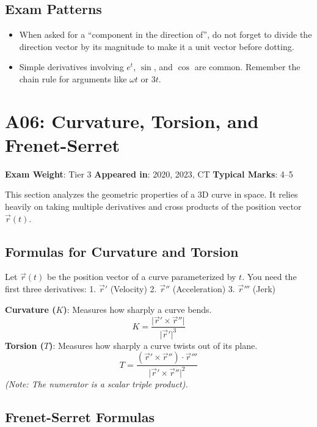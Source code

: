 \documentclass[
]{article}
\providecommand{\tightlist}{%
  \setlength{\itemsep}{0pt}\setlength{\parskip}{0pt}}
\renewenvironment{quote}
  {\begin{tcolorbox}[
     colback=calloutbg,
     colframe=calloutframe,
     colupper=callouttext,
     arc=3pt,
     boxrule=0.5pt,
     leftrule=0.5pt,
     borderline west={3pt}{0pt}{calloutaccent},
     left=8pt,
     right=8pt,
     top=6pt,
     bottom=6pt
   ]}
  {\end{tcolorbox}}
\begin{document}
\subsection{Exam Patterns}\label{exam-patterns-4}

\begin{itemize}
\tightlist
\item
  When asked for a ``component in the direction of'', do not forget to
  divide the direction vector by its magnitude to make it a unit vector
  before dotting.
\item
  Simple derivatives involving \(e^t\), \(\sin\), and \(\cos\) are
  common. Remember the chain rule for arguments like \(\omega t\) or
  \(3t\).
\end{itemize}

\section{A06: Curvature, Torsion, and
Frenet-Serret}\label{a06-curvature-torsion-and-frenet-serret}

\begin{quote}
\textbf{Exam Weight}: Tier 3 \textbar{} \textbf{Appeared in}: 2020,
2023, CT \textbar{} \textbf{Typical Marks}: 4--5
\end{quote}

This section analyzes the geometric properties of a 3D curve in space.
It relies heavily on taking multiple derivatives and cross products of
the position vector \(\vec{r}(t)\).

\subsection{Formulas for Curvature and
Torsion}\label{formulas-for-curvature-and-torsion}

Let \(\vec{r}(t)\) be the position vector of a curve parameterized by
\(t\). You need the first three derivatives: 1. \(\vec{r}'\) (Velocity)
2. \(\vec{r}''\) (Acceleration) 3. \(\vec{r}'''\) (Jerk)

\textbf{Curvature (\(K\))}: Measures how sharply a curve bends.
\[
K = \frac{\lvert \vec{r}' \times \vec{r}'' \rvert}{\lvert \vec{r}' \rvert^3}
\]
\textbf{Torsion (\(T\))}: Measures how sharply a curve twists out of its
plane.
\[
T = \frac{(\vec{r}' \times \vec{r}'') \cdot \vec{r}'''}{\lvert \vec{r}' \times \vec{r}'' \rvert^2}
\]
\emph{(Note: The numerator is a scalar triple product).}

\subsection{Frenet-Serret Formulas}\label{frenet-serret-formulas}
\end{document}
